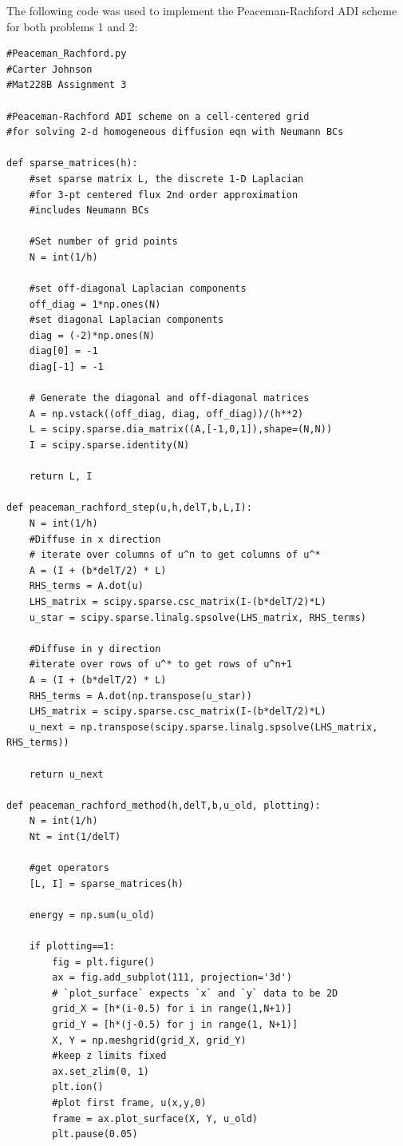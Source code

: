 \documentclass[12pt]{article}
\begin{document}
The following code was used to implement the Peaceman-Rachford ADI scheme for both problems 1 and 2:
\begin{verbatim}
#Peaceman_Rachford.py
#Carter Johnson
#Mat228B Assignment 3

#Peaceman-Rachford ADI scheme on a cell-centered grid
#for solving 2-d homogeneous diffusion eqn with Neumann BCs

def sparse_matrices(h):
    #set sparse matrix L, the discrete 1-D Laplacian
    #for 3-pt centered flux 2nd order approximation
    #includes Neumann BCs

    #Set number of grid points
    N = int(1/h)

    #set off-diagonal Laplacian components
    off_diag = 1*np.ones(N)
    #set diagonal Laplacian components
    diag = (-2)*np.ones(N)
    diag[0] = -1
    diag[-1] = -1

    # Generate the diagonal and off-diagonal matrices
    A = np.vstack((off_diag, diag, off_diag))/(h**2)
    L = scipy.sparse.dia_matrix((A,[-1,0,1]),shape=(N,N))
    I = scipy.sparse.identity(N)

    return L, I

def peaceman_rachford_step(u,h,delT,b,L,I):
    N = int(1/h)
    #Diffuse in x direction
    # iterate over columns of u^n to get columns of u^*
    A = (I + (b*delT/2) * L)
    RHS_terms = A.dot(u)
    LHS_matrix = scipy.sparse.csc_matrix(I-(b*delT/2)*L)
    u_star = scipy.sparse.linalg.spsolve(LHS_matrix, RHS_terms) 

    #Diffuse in y direction
    #iterate over rows of u^* to get rows of u^n+1
    A = (I + (b*delT/2) * L)
    RHS_terms = A.dot(np.transpose(u_star))
    LHS_matrix = scipy.sparse.csc_matrix(I-(b*delT/2)*L)
    u_next = np.transpose(scipy.sparse.linalg.spsolve(LHS_matrix, RHS_terms))

    return u_next

def peaceman_rachford_method(h,delT,b,u_old, plotting):
    N = int(1/h)
    Nt = int(1/delT)

    #get operators
    [L, I] = sparse_matrices(h)

    energy = np.sum(u_old)
    
    if plotting==1:
        fig = plt.figure()
        ax = fig.add_subplot(111, projection='3d')
        # `plot_surface` expects `x` and `y` data to be 2D
        grid_X = [h*(i-0.5) for i in range(1,N+1)]
        grid_Y = [h*(j-0.5) for j in range(1, N+1)]
        X, Y = np.meshgrid(grid_X, grid_Y)  
        #keep z limits fixed
        ax.set_zlim(0, 1)
        plt.ion()
        #plot first frame, u(x,y,0)
        frame = ax.plot_surface(X, Y, u_old)
        plt.pause(0.05)



\end{verbatim}
\end{document}
